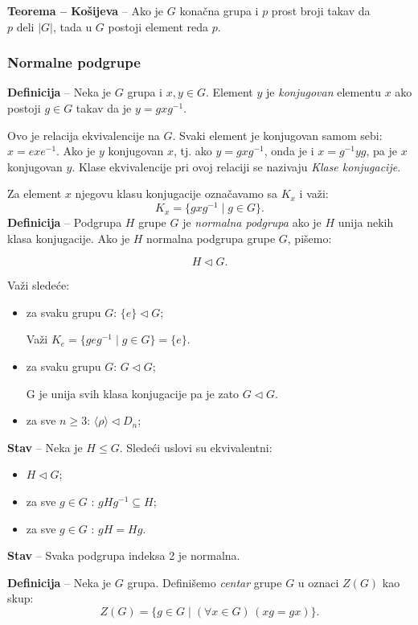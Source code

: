 \documentclass[a4paper,12pt]{article}
\newcommand{\f}[1]{\(#1\)}
\begin{document}
\textbf{Teorema -- Košijeva} -- Ako je \f{G} konačna grupa i \f{p} prost broji takav da
\f{p \text{ deli } |G|}, tada u \f{G} postoji element reda \f{p}.


\subsubsection{Normalne podgrupe}
\textbf{Definicija} -- Neka je \f{G} grupa i \f{x, y \in G}. Element \f{y} je \emph{konjugovan} 
elementu \f{x} ako postoji \f{g \in G} takav da je \f{y = g x g^{-1}}.

Ovo je relacija ekvivalencije na \f{G}. 
Svaki element je konjugovan samom sebi: \f{x = e x e^{-1}}.
Ako je \f{y} konjugovan \f{x}, tj. ako \f{y = gxg^{-1}}, onda je i \f{x = g^{-1}yg}, pa je \f{x} konjugovan \f{y}.
Klase ekvivalencije pri ovoj relaciji se nazivaju \emph{Klase konjugacije}.

Za element \f{x} njegovu klasu konjugacije označavamo sa \f{K_x} i važi:
\[
  K_x = \{gxg^{-1} \mid g \in G\}.
\]
\textbf{Definicija} -- Podgrupa \f{H} grupe \f{G} je \emph{normalna podgrupa} ako je \f{H} unija nekih klasa konjugacije.
Ako je \f{H} normalna podgrupa grupe \f{G}, pišemo:

\[H \triangleleft G. \]

Važi sledeće:
\begin{itemize}
\item za svaku grupu \f{G}: \f{\{e\} \triangleleft G};

Važi \f{K_e = \{geg^{-1} \mid g \in G\} = \{e\}}.
\item za svaku grupu \f{G}: \f{G \triangleleft G};

G je unija svih klasa konjugacije pa je zato \f{G \triangleleft G}.
\item za sve \f{n \geq 3}: \f{ \langle \rho \rangle \triangleleft D_n};
\end{itemize}

\textbf{Stav} -- Neka je \f{H \leq G}. Sledeći uslovi su ekvivalentni:
\begin{itemize}
  \item \f{H \triangleleft G};
  \item za sve \f{g \in G} : \f{gHg^{-1} \subseteq H};
  \item za sve \f{g \in G} : \f{gH = Hg}.
\end{itemize}

\textbf{Stav} -- Svaka podgrupa indeksa 2 je normalna.

\medskip
\textbf{Definicija} -- Neka je \f{G} grupa. Definišemo \emph{centar} grupe \f{G} u oznaci \f{Z(G)} kao skup:
\[
  Z(G) = \{ g \in G \mid (\forall x \in G) \, (xg = gx) \}.
\]
\end{document}
